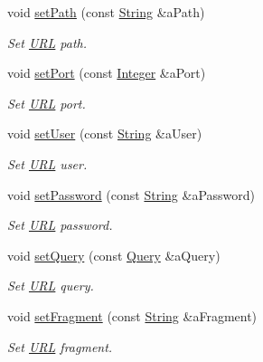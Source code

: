 \begin{DoxyCompactItemize}
void \hyperlink{classostk_1_1io_1_1_u_r_l_a9889bf7f7516b095adadebea4ba3ceae}{set\+Path} (const \hyperlink{namespaceostk_1_1io_a95d49b120613a7610cb1b4f03b1116b6}{String} \&a\+Path)
\begin{DoxyCompactList}\small\item\em Set \hyperlink{classostk_1_1io_1_1_u_r_l}{U\+RL} path. \end{DoxyCompactList}\item 
void \hyperlink{classostk_1_1io_1_1_u_r_l_a991fe376c996ad6457ebbd8b976c44ec}{set\+Port} (const \hyperlink{namespaceostk_1_1io_a35328f680550d000b2754860bbe1d268}{Integer} \&a\+Port)
\begin{DoxyCompactList}\small\item\em Set \hyperlink{classostk_1_1io_1_1_u_r_l}{U\+RL} port. \end{DoxyCompactList}\item 
void \hyperlink{classostk_1_1io_1_1_u_r_l_ab12a067e5d0e37707db80d16bbdf7251}{set\+User} (const \hyperlink{namespaceostk_1_1io_a95d49b120613a7610cb1b4f03b1116b6}{String} \&a\+User)
\begin{DoxyCompactList}\small\item\em Set \hyperlink{classostk_1_1io_1_1_u_r_l}{U\+RL} user. \end{DoxyCompactList}\item 
void \hyperlink{classostk_1_1io_1_1_u_r_l_a2d5ddc1fc8f2693c376d6f4794b1ed26}{set\+Password} (const \hyperlink{namespaceostk_1_1io_a95d49b120613a7610cb1b4f03b1116b6}{String} \&a\+Password)
\begin{DoxyCompactList}\small\item\em Set \hyperlink{classostk_1_1io_1_1_u_r_l}{U\+RL} password. \end{DoxyCompactList}\item 
void \hyperlink{classostk_1_1io_1_1_u_r_l_a948c7c671b2b36ff4a62534990aa86da}{set\+Query} (const \hyperlink{namespaceostk_1_1io_aeabc644ba5c25896df8014bd0271f970}{Query} \&a\+Query)
\begin{DoxyCompactList}\small\item\em Set \hyperlink{classostk_1_1io_1_1_u_r_l}{U\+RL} query. \end{DoxyCompactList}\item 
void \hyperlink{classostk_1_1io_1_1_u_r_l_a3e646332fa91ee14876c15782967a960}{set\+Fragment} (const \hyperlink{namespaceostk_1_1io_a95d49b120613a7610cb1b4f03b1116b6}{String} \&a\+Fragment)
\begin{DoxyCompactList}\small\item\em Set \hyperlink{classostk_1_1io_1_1_u_r_l}{U\+RL} fragment. \end{DoxyCompactList}\end{DoxyCompactItemize}
